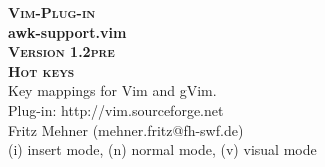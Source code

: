 \documentclass[oneside,10pt,landscape,DIV16]{scrartcl}
\newcommand{\Pluginversion}{1.2pre}
\begin{document}
%

\begin{multicols}{3}
%
\begin{center}
%
\textbf{\textsc{\small{Vim-Plug-in}}}\\
\textbf{\LARGE{awk-support.vim}}\\
\textbf{\textsc{\small{Version \Pluginversion}}}\\
\vspace{5mm}%
\textbf{\textsc{\Huge{Hot keys}}}\\ 
\vspace{5mm}%
Key mappings for Vim and gVim.\\
Plug-in: http://vim.sourceforge.net\\
Fritz Mehner (mehner.fritz@fh-swf.de)\\
\vspace{1.0mm}
{\normalsize (i)} insert mode, {\normalsize (n)} normal mode, {\normalsize (v)} visual mode\\
\vspace{4.0mm}


\end{center}
\end{multicols}
\end{document}
